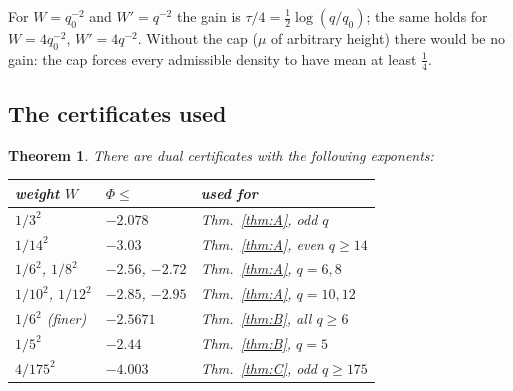 \documentclass[11pt]{amsart}
\newtheorem{theorem}{Theorem}[section]
\theoremstyle{definition}
\theoremstyle{remark}
\numberwithin{equation}{section}
\begin{document}
For $W=q_0^{-2}$ and $W'=q^{-2}$ the gain is $\tau/4=\frac12\log(q/q_0)$; the same holds for $W=4q_0^{-2}$, $W'=4q^{-2}$.
Without the cap ($\mu$ of arbitrary height) there would be no gain: the cap forces every admissible density to have
mean at least $\frac14$.

\subsection{The certificates used}

\begin{theorem}\label{thm:cert}
There are dual certificates with the following exponents:
\begin{center}
\begin{tabular}{@{}lll@{}}
\toprule
weight $W$ & $\Phi\le$ & used for\\
\midrule
$1/3^2$ & $-2.078$ & Thm.~\ref{thm:A}, odd $q$\\
$1/14^2$ & $-3.03$ & Thm.~\ref{thm:A}, even $q\ge14$\\
$1/6^2$, $1/8^2$ & $-2.56$, $-2.72$ & Thm.~\ref{thm:A}, $q=6,8$\\
$1/10^2$, $1/12^2$ & $-2.85$, $-2.95$ & Thm.~\ref{thm:A}, $q=10,12$\\
$1/6^2$ (finer) & $-2.5671$ & Thm.~\ref{thm:B}, all $q\ge6$\\
$1/5^2$ & $-2.44$ & Thm.~\ref{thm:B}, $q=5$\\
$4/175^2$ & $-4.003$ & Thm.~\ref{thm:C}, odd $q\ge175$\\
\bottomrule
\end{tabular}
\end{center}
\end{theorem}
\end{document}
